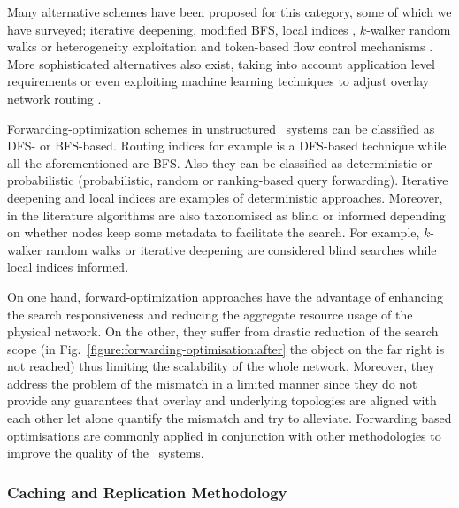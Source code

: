 Many alternative schemes have been proposed for this category, some of which we
have surveyed; iterative deepening, modified BFS, local indices \cite{YG-M2002},
$k$-walker random walks \cite{LCCLS2002} or heterogeneity exploitation and
token-based flow control mechanisms \cite{CRBLS2003}. More sophisticated
alternatives also exist, taking into account application level requirements
or even exploiting machine learning techniques to adjust overlay network
routing \cite{BFLZ2003}.

Forwarding-optimization schemes in unstructured \p\ systems can be classified
as DFS- or BFS-based. Routing indices \cite{CG-M2002} for example is a
DFS-based technique while all the aforementioned are BFS. Also they can
be classified as deterministic or probabilistic (probabilistic, random or
ranking-based query forwarding). Iterative deepening and local indices
\cite{YG-M2002} are examples of deterministic approaches. Moreover, in the
literature algorithms are also taxonomised as blind or informed depending on
whether nodes keep some metadata to facilitate the search. For example,
$k$-walker random walks or iterative deepening are considered blind searches
while local indices informed.

On one hand, forward-optimization approaches have 
the advantage of enhancing the
search responsiveness and reducing the aggregate resource 
usage of the physical network. On the other, 
they suffer from drastic reduction of the search
scope (in Fig.~\ref{figure:forwarding-optimisation:after} the object on
the far right is not reached) thus limiting the scalability of the whole
network. 
Moreover, they address the problem of the mismatch in a limited manner
since they do not provide any guarantees 
that overlay and underlying topologies are
aligned with each other let alone quantify the mismatch 
and try to alleviate.
Forwarding based optimisations are commonly applied in
conjunction with other methodologies to improve 
the quality of the \p\ systems.


\subsubsection{Caching and Replication Methodology}

